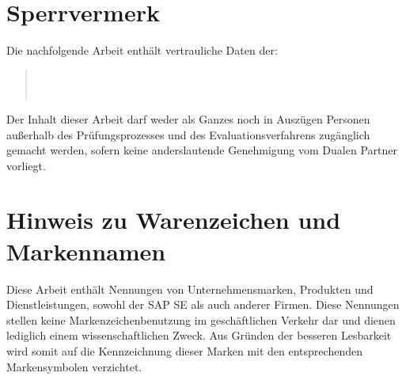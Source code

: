 \section*{Sperrvermerk}
Die nachfolgende Arbeit enthält vertrauliche Daten der:
\begin{quote}
	\firmaName \\
	\firmaStrasse \\
	\firmaPlz
\end{quote}

\vspace{0.5cm}

Der Inhalt dieser Arbeit darf weder als Ganzes noch in Auszügen Personen außerhalb des Prüfungsprozesses und des Evaluationsverfahrens zugänglich gemacht werden, sofern keine anderslautende Genehmigung vom Dualen Partner vorliegt.

\vspace*{\fill}

\section*{Hinweis zu Warenzeichen und Markennamen}

Diese Arbeit enthält Nennungen von Unternehmensmarken, Produkten und Dienstleistungen, sowohl der SAP SE als auch anderer Firmen. Diese Nennungen stellen
keine Markenzeichenbenutzung im geschäftlichen Verkehr dar und dienen lediglich
einem wissenschaftlichen Zweck. Aus Gründen der besseren Lesbarkeit wird somit
auf die Kennzeichnung dieser Marken mit den entsprechenden Markensymbolen verzichtet.
